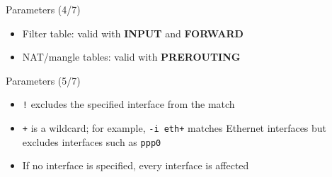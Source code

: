 \begin{frame}[t]{Parameters (4/7)}
\begin{itemize}
  \item Filter table: valid with \textcolor{WarningColor}{\bfseries INPUT} and \textcolor{WarningColor}{\bfseries FORWARD}
  \item NAT/mangle tables: valid with \textcolor{WarningColor}{\bfseries PREROUTING}
\end{itemize}
\end{frame}

\begin{frame}[t]{Parameters (5/7)}
\begin{itemize}
  \item \texttt{!} excludes the specified interface from the match
  \item \texttt{+} is a wildcard; for example, \texttt{-i eth+} matches Ethernet interfaces but excludes interfaces such as \texttt{ppp0}
  \item If no interface is specified, every interface is affected
\end{itemize}
\end{frame}
